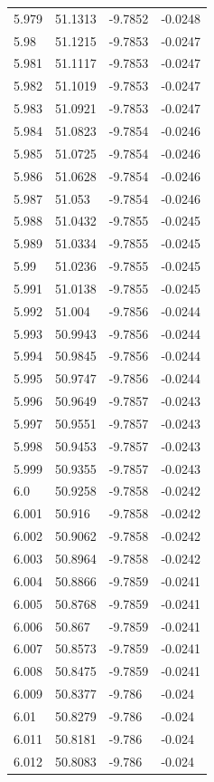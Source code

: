 \begin{tabular}{llll}
5.979 & 51.1313 & -9.7852 & -0.0248 \\
5.98 & 51.1215 & -9.7853 & -0.0247 \\
5.981 & 51.1117 & -9.7853 & -0.0247 \\
5.982 & 51.1019 & -9.7853 & -0.0247 \\
5.983 & 51.0921 & -9.7853 & -0.0247 \\
5.984 & 51.0823 & -9.7854 & -0.0246 \\
5.985 & 51.0725 & -9.7854 & -0.0246 \\
5.986 & 51.0628 & -9.7854 & -0.0246 \\
5.987 & 51.053 & -9.7854 & -0.0246 \\
5.988 & 51.0432 & -9.7855 & -0.0245 \\
5.989 & 51.0334 & -9.7855 & -0.0245 \\
5.99 & 51.0236 & -9.7855 & -0.0245 \\
5.991 & 51.0138 & -9.7855 & -0.0245 \\
5.992 & 51.004 & -9.7856 & -0.0244 \\
5.993 & 50.9943 & -9.7856 & -0.0244 \\
5.994 & 50.9845 & -9.7856 & -0.0244 \\
5.995 & 50.9747 & -9.7856 & -0.0244 \\
5.996 & 50.9649 & -9.7857 & -0.0243 \\
5.997 & 50.9551 & -9.7857 & -0.0243 \\
5.998 & 50.9453 & -9.7857 & -0.0243 \\
5.999 & 50.9355 & -9.7857 & -0.0243 \\
6.0 & 50.9258 & -9.7858 & -0.0242 \\
6.001 & 50.916 & -9.7858 & -0.0242 \\
6.002 & 50.9062 & -9.7858 & -0.0242 \\
6.003 & 50.8964 & -9.7858 & -0.0242 \\
6.004 & 50.8866 & -9.7859 & -0.0241 \\
6.005 & 50.8768 & -9.7859 & -0.0241 \\
6.006 & 50.867 & -9.7859 & -0.0241 \\
6.007 & 50.8573 & -9.7859 & -0.0241 \\
6.008 & 50.8475 & -9.7859 & -0.0241 \\
6.009 & 50.8377 & -9.786 & -0.024 \\
6.01 & 50.8279 & -9.786 & -0.024 \\
6.011 & 50.8181 & -9.786 & -0.024 \\
6.012 & 50.8083 & -9.786 & -0.024 \\

\end{tabular}
